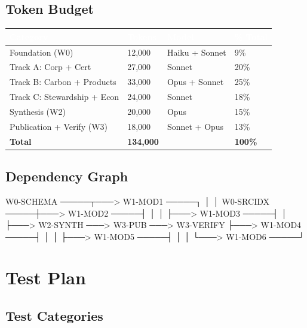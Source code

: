\documentclass[11pt,letterpaper]{article}
\newcommand{\tableheader}[1]{\textbf{\sffamily\textcolor{white}{#1}}}
\begin{document}
\subsection{Token Budget}

\begin{center}
\begin{tabularx}{\textwidth}{L{4cm}C{2cm}C{2cm}C{2cm}}
\toprule
{}
\tableheader{Category} & \tableheader{Tokens} & \tableheader{Model} & \tableheader{\% Total} \\
\midrule
Foundation (W0) & 12,000 & Haiku + Sonnet & 9\% \\
Track A: Corp + Cert & 27,000 & Sonnet & 20\% \\
Track B: Carbon + Products & 33,000 & Opus + Sonnet & 25\% \\
Track C: Stewardship + Econ & 24,000 & Sonnet & 18\% \\
Synthesis (W2) & 20,000 & Opus & 15\% \\
Publication + Verify (W3) & 18,000 & Sonnet + Opus & 13\% \\
\midrule
\textbf{Total} & \textbf{134,000} & & \textbf{100\%} \\
\bottomrule
\end{tabularx}
\end{center}

\subsection{Dependency Graph}

\begin{asciibox}
W0-SCHEMA ─────┬───> W1-MOD1 ─────┐
               │                    │
W0-SRCIDX ─────┼───> W1-MOD2 ─────┤
               │                    │
               ├───> W1-MOD3 ─────┤
               │                    ├───> W2-SYNTH ───> W3-PUB ───> W3-VERIFY
               ├───> W1-MOD4 ─────┤
               │                    │
               ├───> W1-MOD5 ─────┤
               │                    │
               └───> W1-MOD6 ─────┘
\end{asciibox}

\section{Test Plan}

\subsection{Test Categories}
\end{document}
